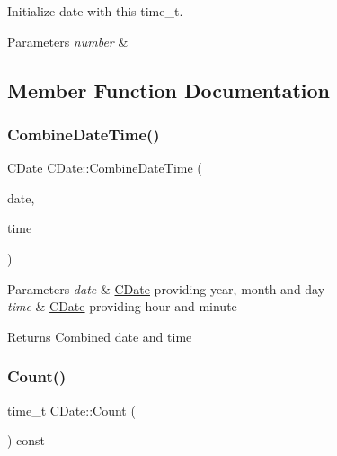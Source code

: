 Initialize date with this time\+\_\+t. 
\begin{DoxyParams}{Parameters}
{\em number} & \\
\hline
\end{DoxyParams}


\subsection{Member Function Documentation}
\mbox{\label{class_c_date_a28c167be273e16b93c80f5d59bd70dd9}} 
\subsubsection{\texorpdfstring{Combine\+Date\+Time()}{CombineDateTime()}}
{\footnotesize\ttfamily \mbox{\hyperlink{class_c_date}{C\+Date}} C\+Date\+::\+Combine\+Date\+Time (\begin{DoxyParamCaption}\item[{const \mbox{\hyperlink{class_c_date}{C\+Date}} \&}]{date,  }\item[{const \mbox{\hyperlink{class_c_date}{C\+Date}} \&}]{time }\end{DoxyParamCaption})\hspace{0.3cm}{\ttfamily [static]}}


\begin{DoxyParams}{Parameters}
{\em date} & \mbox{\hyperlink{class_c_date}{C\+Date}} providing year, month and day \\
\hline
{\em time} & \mbox{\hyperlink{class_c_date}{C\+Date}} providing hour and minute \\
\hline
\end{DoxyParams}
\begin{DoxyReturn}{Returns}
Combined date and time 
\end{DoxyReturn}
\mbox{\label{class_c_date_aa8f18dfb62e341afba7e7b55d8b63b68}} 
\subsubsection{\texorpdfstring{Count()}{Count()}}
{\footnotesize\ttfamily time\+\_\+t C\+Date\+::\+Count (\begin{DoxyParamCaption}{ }\end{DoxyParamCaption}) const}

